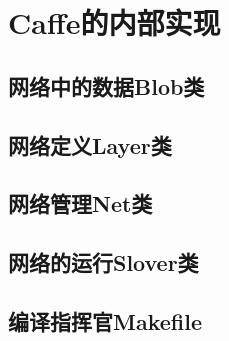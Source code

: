 \documentclass{../CNTeXBookTemplate/NanCNBook}
\begin{document}
\part{Caffe的内部实现}











\chapter{网络中的数据Blob类}

\chapter{网络定义Layer类}

\chapter{网络管理Net类}

\chapter{网络的运行Slover类}




\begin{cnappendix}
\chapter{编译指挥官Makefile}

\end{cnappendix}
\end{document}

